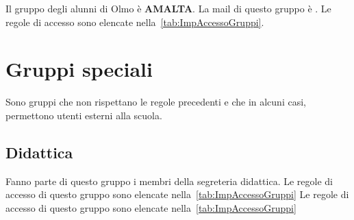 Il gruppo degli alunni di Olmo è \textbf{AMALTA}. La mail di questo gruppo è . Le  regole di accesso  sono elencate nella~\cref{tab:ImpAccessoGruppi}. 
\section{Gruppi speciali}
Sono gruppi che non rispettano le regole precedenti e che in alcuni casi, permettono utenti esterni alla scuola.
\subsection{Didattica}
Fanno parte di questo gruppo i membri della segreteria didattica. Le  regole di accesso di questo gruppo sono elencate nella~\cref{tab:ImpAccessoGruppi}
Le  regole di accesso di questo gruppo sono elencate nella~\cref{tab:ImpAccessoGruppi}
